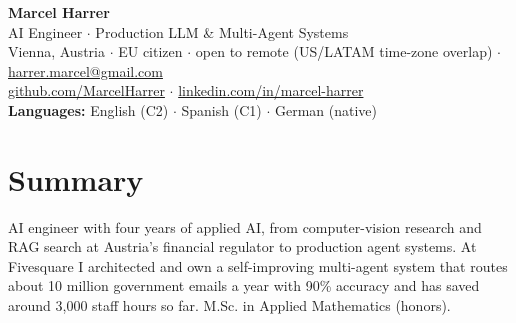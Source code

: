 \documentclass[10pt,a4paper]{article}
\begin{document}
\begin{center}
{\LARGE\bfseries Marcel Harrer}\\[3pt]
AI Engineer $\cdot$ Production LLM \& Multi-Agent Systems\\
Vienna, Austria $\cdot$ EU citizen $\cdot$ open to remote (US/LATAM time-zone overlap) $\cdot$ \href{mailto:harrer.marcel@gmail.com}{harrer.marcel@gmail.com}\\
\href{https://github.com/MarcelHarrer}{github.com/MarcelHarrer} $\cdot$ \href{https://linkedin.com/in/marcel-harrer}{linkedin.com/in/marcel-harrer}\\
\textbf{Languages:} English (C2) $\cdot$ Spanish (C1) $\cdot$ German (native)
\end{center}
\vspace{-0.8em}

\section{Summary}
AI engineer with four years of applied AI, from computer-vision research and RAG search at Austria's financial regulator to production agent systems. At Fivesquare I architected and own a self-improving multi-agent system that routes about 10 million government emails a year with 90\% accuracy and has saved around 3,000 staff hours so far. M.Sc. in Applied Mathematics (honors).
\end{document}
